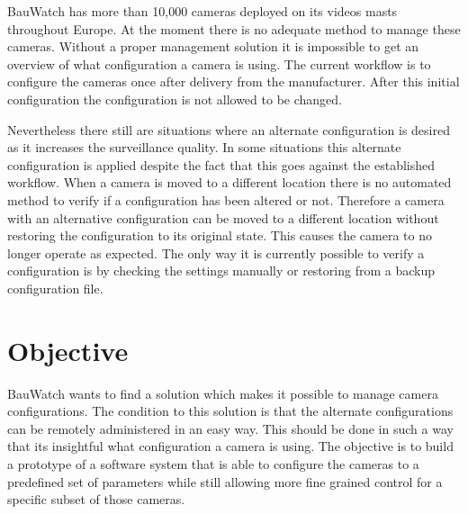 
BauWatch has more than 10,000 cameras deployed on its videos masts throughout Europe. At the moment there is no adequate method to manage these cameras.
Without a proper management solution it is impossible to get an overview of what configuration a camera is using.
The current workflow is to configure the cameras once after delivery from the manufacturer.
After this initial configuration the configuration is not allowed to be changed.

Nevertheless there still are situations where an alternate configuration is desired as it increases the surveillance quality.
In some situations this alternate configuration is applied despite the fact that this goes against the established workflow.
When a camera is moved to a different location there is no automated method to verify if a configuration has been altered or not.
Therefore a camera with an alternative configuration can be moved to a different location without restoring the configuration to its original state.
This causes the camera to no longer operate as expected.
The only way it is currently possible to verify a configuration is by checking the settings manually or restoring from a backup configuration file.


\section{Objective}
BauWatch wants to find a solution which makes it possible to manage camera configurations.
The condition to this solution is that the alternate configurations can be remotely administered in an easy way.
This should be done in such a way that its insightful what configuration a camera is using.
The objective is to build a prototype of a software system that is able to configure the cameras to a predefined set of parameters while still allowing
more fine grained control for a specific subset of those cameras.

